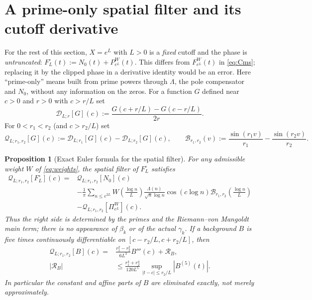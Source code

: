 \documentclass[11pt,a4paper]{article}
\numberwithin{equation}{section}
\newtheorem{proposition}[theorem]{Proposition}
\theoremstyle{definition}
\theoremstyle{remark}
\begin{document}
\section{A prime-only spatial filter and its cutoff derivative}
\label{sec:filter-v4}
For the rest of this section, $X=e^L$ with $L>0$ is a \emph{fixed}
cutoff and the phase is \emph{untruncated}:
$F_L^\circ(t):=N_0(t)+P_{e^L}^W(t)$. This differs from
$F_{e^L}^W(t)$ in \eqref{eq:Cms}; replacing it by the clipped
phase in a derivative identity would be an error.
Here ``prime-only'' means built from prime powers through $\Lambda$,
the pole compensator and $N_0$, without any information on the zeros.
For a function $G$ defined near $c>0$ and $r>0$ with $c>r/L$ set
\begin{equation}\label{eq:Dr-v4}
 \mathscr D_{L;r}[G](c):=
 \frac{G(c+r/L)-G(c-r/L)}{2r}.
\end{equation}
For $0<r_1<r_2$ (and $c>r_2/L$) set
\begin{equation}\label{eq:Qdef-v4}
 \mathscr Q_{L;r_1,r_2}[G](c)
 :=\mathscr D_{L;r_1}[G](c)-\mathscr D_{L;r_2}[G](c),\qquad
 \mathscr B_{r_1,r_2}(v):=\frac{\sin(r_1v)}{r_1}
 -\frac{\sin(r_2v)}{r_2}.
\end{equation}
\begin{proposition}[Exact Euler formula for the spatial filter]
\label{prop:Qexact-v4}
For any admissible weight $W$ of \eqref{eq:weights}, the spatial
filter of $F_L^\circ$ satisfies
\begin{equation}\label{eq:Qprime-v4}
\begin{split}
\mathscr Q_{L;r_1,r_2}[F_L^\circ](c)
={}&\mathscr Q_{L;r_1,r_2}[N_0](c)\\
&-\frac1\pi\sum_{n\le e^{2L}}
 W\!\left(\frac{\log n}{L}\right)
 \frac{\Lambda(n)}{\sqrt n\log n}\cos(c\log n)
 \mathscr B_{r_1,r_2}\!\left(\frac{\log n}{L}\right)\\
&-\mathscr Q_{L;r_1,r_2}[\Pi_{e^L}^W](c).
\end{split}
\end{equation}
Thus the right side is determined by the primes and the
Riemann--von Mangoldt main term; there is no appearance of
$\beta_k$ or of the actual $\gamma_k$.
If a background $B$ is five times continuously differentiable on
$[c-r_2/L,c+r_2/L]$, then
\begin{equation}\label{eq:Qbackground-v4}
\begin{split}
\mathscr Q_{L;r_1,r_2}[B](c)
={}&\frac{r_1^2-r_2^2}{6L^3}B'''(c)+\mathcal R_B,\\
|\mathcal R_B|&\le\frac{r_1^4+r_2^4}{120L^5}
 \sup_{|t-c|\le r_2/L}|B^{(5)}(t)|.
\end{split}
\end{equation}
In particular the constant and affine parts of $B$ are eliminated
\emph{exactly}, not merely approximately.
\end{proposition}
\end{document}
